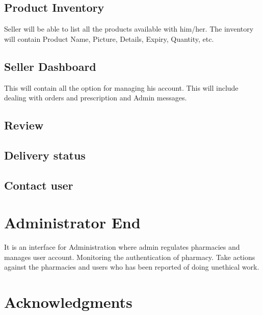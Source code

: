 \documentclass[fleqn,10pt]{../SelfArx} %
\begin{document}
\subsection{Product Inventory}

Seller will be able to list all the products available with him/her. The inventory will contain Product Name, Picture, Details, Expiry, Quantity, etc.
\subsection{Seller Dashboard}

This will contain all the option for managing his account. This will include dealing with orders and prescription and Admin messages.
\subsection{Review}

\subsection{Delivery status}

\subsection{Contact user}

\section{Administrator End}
It is an interface for Administration where admin regulates  pharmacies and manages user account. Monitoring the authentication of pharmacy.
Take actions against the pharmacies and users who has been reported of doing unethical work.

\section*{Acknowledgments} %


%
%

\end{document}

